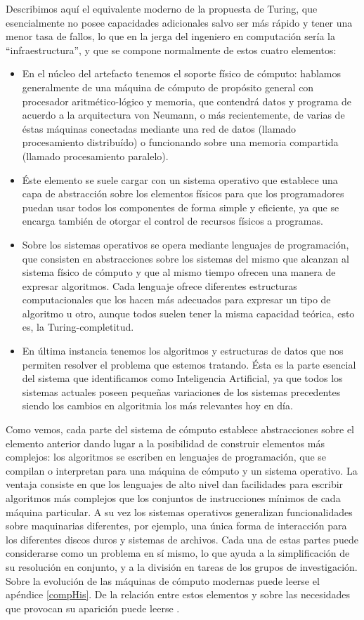 \documentclass[12pt]{memoir}
\begin{document}
Describimos aquí el equivalente moderno de la propuesta de Turing, que esencialmente no posee capacidades adicionales salvo ser más rápido y tener una menor tasa de fallos, lo que en la jerga del ingeniero en computación sería la ``infraestructura'', y que se compone normalmente de estos cuatro elementos:

\begin{itemize}
	\item En el núcleo del artefacto tenemos el soporte físico de cómputo: hablamos generalmente de una máquina de cómputo de propósito general con procesador aritmético-lógico y memoria, que contendrá datos y programa de acuerdo a la arquitectura von Neumann, o más recientemente, de varias de éstas máquinas conectadas mediante una red de datos (llamado procesamiento distribuído) o funcionando sobre una memoria compartida (llamado procesamiento paralelo).
	\item Éste elemento se suele cargar con un sistema operativo que establece una capa de abstracción sobre los elementos físicos para que los programadores puedan usar todos los componentes de forma simple y eficiente, ya que se encarga también de otorgar el control de recursos físicos a programas.
	\item Sobre los sistemas operativos se opera mediante lenguajes de programación, que consisten en abstracciones sobre los sistemas del mismo que alcanzan al sistema físico de cómputo y que al mismo tiempo ofrecen una manera de expresar algoritmos. Cada lenguaje ofrece diferentes estructuras computacionales que los hacen más adecuados para expresar un tipo de algoritmo u otro, aunque todos suelen tener la misma capacidad teórica, esto es, la Turing-completitud.
	\item En última instancia tenemos los algoritmos y estructuras de datos que nos permiten resolver el problema que estemos tratando. Ésta es la parte esencial del sistema que identificamos como Inteligencia Artificial, ya que todos los sistemas actuales poseen pequeñas variaciones de los sistemas precedentes siendo los cambios en algoritmia los más relevantes hoy en día.
\end{itemize}

Como vemos, cada parte del sistema de cómputo establece abstracciones sobre el elemento anterior dando lugar a la posibilidad de construir elementos más complejos: los algoritmos se escriben en lenguajes de programación, que se compilan o interpretan para una máquina de cómputo y un sistema operativo. La ventaja consiste en que los lenguajes de alto nivel dan facilidades para escribir algoritmos más complejos que los conjuntos de instrucciones mínimos de cada máquina particular. A su vez los sistemas operativos generalizan funcionalidades sobre maquinarias diferentes, por ejemplo, una única forma de interacción para los diferentes discos duros y sistemas de archivos. Cada una de estas partes puede considerarse como un problema en sí mismo, lo que ayuda a la simplificación de su resolución en conjunto, y a la división en tareas de los grupos de investigación. Sobre la evolución de las máquinas de cómputo modernas puede leerse el apéndice \ref{compHis}. De la relación entre estos elementos y sobre las necesidades que provocan su aparición puede leerse \parencite{wiki:computerhistory}.
\end{document}
